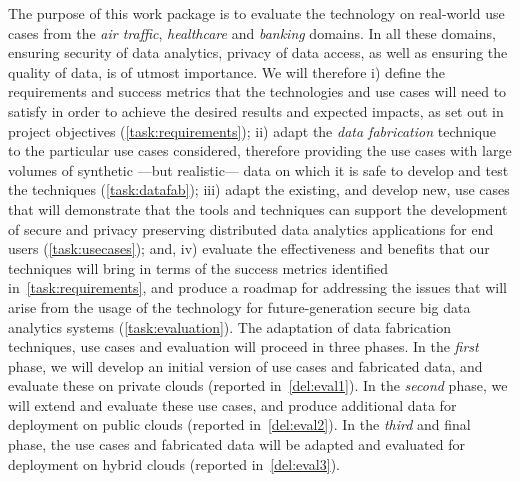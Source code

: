 \begin{Workpackage}{\thewpno}
\begin{WPDescription}
The purpose of this work package is to evaluate the \TheProject technology on real-world use cases from the \emph{air traffic}, \emph{healthcare} and \emph{banking} domains. In all these domains, ensuring security of data analytics, privacy of data access, as well as ensuring the quality of data, is of utmost importance. We will therefore i) define the requirements and success metrics that the \TheProject{} technologies and use cases will need to satisfy in order to achieve the desired results and expected impacts, as set out in project objectives (\ref{task:requirements}); ii) adapt the \TheProject{} \emph{data fabrication} technique to the particular use cases considered, therefore providing the use cases with large volumes of synthetic ---but realistic--- data on which it is safe to develop and test the \TheProject{} techniques (\ref{task:datafab}); iii) adapt the existing, and develop new, use cases that will demonstrate that the \TheProject{} tools and techniques can support the development of secure and privacy preserving distributed data analytics applications for end users (\ref{task:usecases}); and, iv)  evaluate the effectiveness and benefits that our techniques will bring in terms of the success metrics identified in~\ref{task:requirements}, and produce a roadmap for addressing the issues that will arise from the usage of the \TheProject{} technology for future-generation secure big data analytics systems (\ref{task:evaluation}). The adaptation of data fabrication techniques, use cases and evaluation will proceed in three phases. In the \emph{first} phase, we will develop an initial version of use cases and fabricated data, and evaluate these on private clouds (reported in~\ref{del:eval1}). In the \emph{second} phase, we will extend and evaluate these use cases, and produce additional data for deployment on public clouds (reported in~\ref{del:eval2}). In the \emph{third} and final phase, the use cases and fabricated data will be adapted and evaluated for deployment on hybrid clouds (reported in~\ref{del:eval3}).
\end{WPDescription}

\begin{Task}


\end{Task}
\end{Workpackage}
